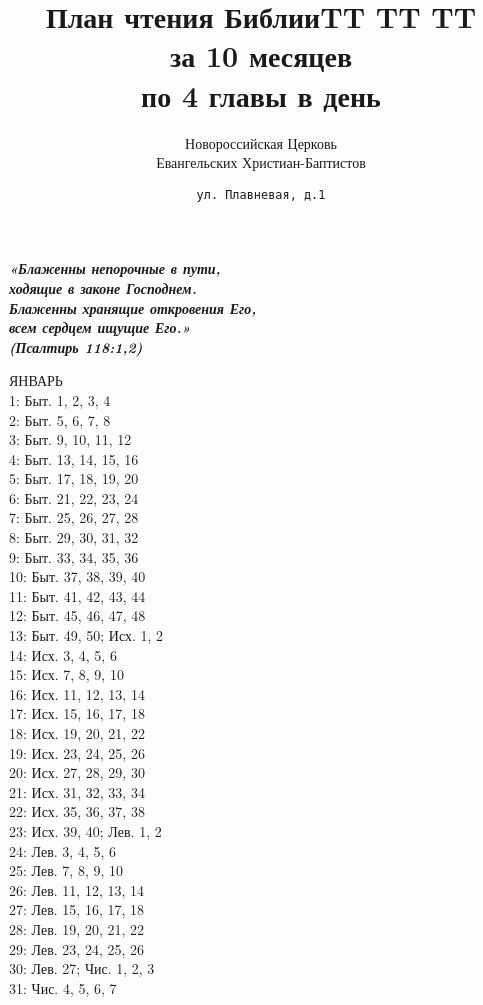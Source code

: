 \documentclass[fontsize=16pt,letterpaper,DIV=6]{scrartcl}
\title{План чтения БиблииTT TT TT \\за 10 месяцев \\по 4 главы в день}
\author{Новороссийская Церковь\\Евангельских Христиан-Баптистов}
\date{\texttt{ул. Плавневая, д.1}}
\begin{document}
\maketitle
\setcounter{page}{0}
\thispagestyle{empty}
\clearpage
{}
{\centering\Large\itshape\bfseries «Блаженны непорочные в пути,\\ ходящие в законе Господнем.\\
Блаженны хранящие откровения Его,\\ всем сердцем ищущие Его.»\\
(Псалтирь 118:1,2)
\par}
\clearpage
\begin{multicols}{2}
ЯНВАРЬ
\\  1: Быт. 1, 2, 3, 4
\\  2: Быт. 5, 6, 7, 8
\\  3: Быт. 9, 10, 11, 12
\\  4: Быт. 13, 14, 15, 16
\\  5: Быт. 17, 18, 19, 20
\\  6: Быт. 21, 22, 23, 24
\\  7: Быт. 25, 26, 27, 28
\\  8: Быт. 29, 30, 31, 32
\\  9: Быт. 33, 34, 35, 36
\\  10: Быт. 37, 38, 39, 40
\\  11: Быт. 41, 42, 43, 44
\\  12: Быт. 45, 46, 47, 48
\\  13: Быт. 49, 50; Исх. 1, 2
\\  14: Исх. 3, 4, 5, 6
\\  15: Исх. 7, 8, 9, 10
\\  16: Исх. 11, 12, 13, 14
\\  17: Исх. 15, 16, 17, 18
\\  18: Исх. 19, 20, 21, 22
\\  19: Исх. 23, 24, 25, 26
\\  20: Исх. 27, 28, 29, 30
\\  21: Исх. 31, 32, 33, 34
\\  22: Исх. 35, 36, 37, 38
\\  23: Исх. 39, 40; Лев. 1, 2
\\  24: Лев. 3, 4, 5, 6
\\  25: Лев. 7, 8, 9, 10
\\  26: Лев. 11, 12, 13, 14
\\  27: Лев. 15, 16, 17, 18
\\  28: Лев. 19, 20, 21, 22
\\  29: Лев. 23, 24, 25, 26
\\  30: Лев. 27; Чис. 1, 2, 3
\\  31: Чис. 4, 5, 6, 7


\end{multicols}
\end{document}
